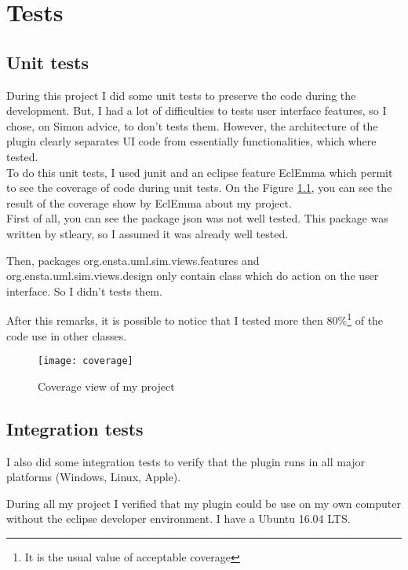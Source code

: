 
\chapter{Tests}
\label{chap:test}

\section{Unit tests}

During this project I did some unit tests to preserve the code during the development. But, I had a lot of difficulties to tests user interface features, so I chose, on Simon advice, to don't tests them. However, the architecture of the plugin clearly separates UI code from essentially functionalities, which where tested.
~\\

To do this unit tests, I used junit and an eclipse feature EclEmma which permit to see the coverage of code during unit tests. On the Figure \ref{fig:coverage}, you can see the result of the coverage show by EclEmma about my project.
~\\

First of all, you can see the package json was not well tested. This package was written by stleary\cite{json}, so I assumed it was already well tested.

Then, packages org.ensta.uml.sim.views.features and org.ensta.uml.sim.views.design only contain class which do action on the user interface. So I didn't tests them.

After this remarks, it is possible to notice that I tested more then 80\%\footnote{It is the usual value of acceptable coverage} of the code use in other classes.


\begin{figure}[h]
  \centering
  \texttt{[image: coverage]}
  \caption{Coverage view of my project}
  \label{fig:coverage}
\end{figure}

\section{Integration tests}

I also did some integration tests to verify that the plugin runs in all major platforms (Windows, Linux, Apple).

During all my project I verified that my plugin could be use on my own computer without the eclipse developer environment. I have a Ubuntu 16.04 LTS.

